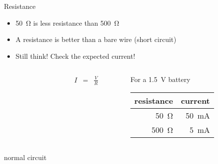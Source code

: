 \documentclass[svgnames,x11names]{beamer}
\begin{document}
\begin{frame}{Resistance}
  \begin{itemize}
  \item \SI{50}{\ohm} is less resistance than \SI{500}{\ohm}
  \item A resistance is better than a bare wire (short circuit)
  \item Still think!  Check the expected current!
  \end{itemize}
  \begin{columns}[onlytextwidth]
    \begin{column}{0.35\textwidth}
    \end{column}
    \begin{column}{0.2\textwidth}
      \begin{eqnarray*}
        I &=& \frac{V}{R}
      \end{eqnarray*}
    \end{column}
    \begin{column}{0.3\textwidth}
      For a \SI{1.5}{V} battery
      \begin{tabular}{rr}\toprule
        resistance & current \\\midrule
        \SI{50}{\ohm} & \SI{50}{\milli\ampere}\\
        \SI{500}{\ohm} & \SI{5}{\milli\ampere}\\
      \end{tabular}
    \end{column}
  \end{columns}
  \begin{block}{}
    normal circuit
  \end{block}
\end{frame}
\end{document}
